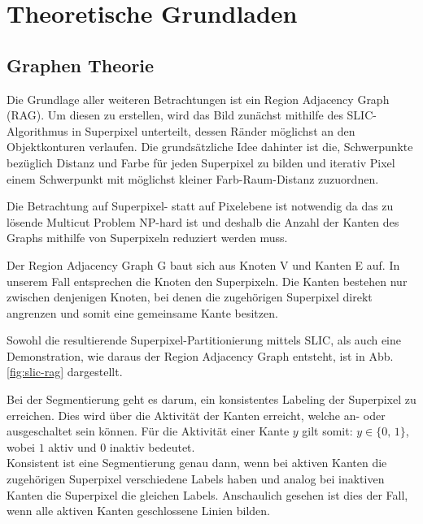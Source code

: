 \chapter{Theoretische Grundladen}\label{ch:theoretischeGrundlagen}
\section{Graphen Theorie}\label{sec:graphTheory}

Die Grundlage aller weiteren Betrachtungen ist ein Region Adjacency Graph (RAG). Um diesen zu erstellen, wird das Bild zunächst mithilfe des SLIC-Algorithmus \cite{slic} in Superpixel unterteilt, dessen Ränder möglichst an den Objektkonturen verlaufen. Die grundsätzliche Idee dahinter ist die, Schwerpunkte bezüglich Distanz und Farbe für jeden Superpixel zu bilden und iterativ Pixel einem Schwerpunkt mit möglichst kleiner Farb-Raum-Distanz zuzuordnen. 

Die Betrachtung auf Superpixel- statt auf Pixelebene ist notwendig da das zu lösende Multicut Problem NP-hard ist und deshalb die Anzahl der Kanten des Graphs mithilfe von Superpixeln reduziert werden muss.

Der Region Adjacency Graph G baut sich aus Knoten V und Kanten E auf. In unserem Fall entsprechen die Knoten den Superpixeln. Die Kanten bestehen nur zwischen denjenigen Knoten, bei denen die zugehörigen Superpixel direkt angrenzen und somit eine gemeinsame Kante besitzen. 

Sowohl die resultierende Superpixel-Partitionierung mittels SLIC, als auch eine Demonstration, wie daraus der Region Adjacency Graph entsteht, ist in Abb. \ref{fig:slic-rag} dargestellt.

\begin{figure}[H]

	\centering
	\hfill
\end{figure}
\label{fig:slic-rag}

\vspace{0.5cm}


Bei der Segmentierung geht es darum, ein konsistentes Labeling der Superpixel zu erreichen. Dies wird über die Aktivität der Kanten erreicht, welche an- oder ausgeschaltet sein können. Für die Aktivität einer Kante $y$ gilt somit: $y \in \{\text{0, 1}\}$, wobei $1$ aktiv und $0$ inaktiv bedeutet. \\
Konsistent ist eine Segmentierung genau dann, wenn bei aktiven Kanten die zugehörigen Superpixel verschiedene Labels haben und analog bei inaktiven Kanten die Superpixel die gleichen Labels. Anschaulich gesehen ist dies der Fall, wenn alle aktiven Kanten geschlossene Linien bilden.


